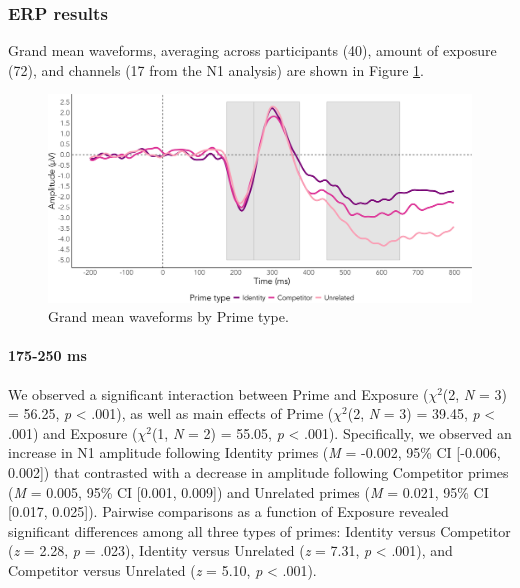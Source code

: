 \documentclass[
  12pt,
  twoside]{article}
\begin{document}
\hypertarget{erp-results}{%
\subsubsection{ERP results}\label{erp-results}}

Grand mean waveforms, averaging across participants (40), amount of exposure (72), and channels (17 from the N1 analysis) are shown in Figure \ref{fig:grand-fig}.

\begin{figure}[H]

{\centering \includegraphics[width=\textwidth]{sections/code/outputs/grand_plot} 

}

\caption{Grand mean waveforms by Prime type.}\label{fig:grand-fig}
\end{figure}

\hypertarget{ms}{%
\paragraph{175-250 ms}\label{ms}}

We observed a significant interaction between Prime and Exposure (\(\chi^2\)(2, \emph{N} = 3) = 56.25, \emph{p} \textless{} .001), as well as main effects of Prime (\(\chi^2\)(2, \emph{N} = 3) = 39.45, \emph{p} \textless{} .001) and Exposure (\(\chi^2\)(1, \emph{N} = 2) = 55.05, \emph{p} \textless{} .001).
Specifically, we observed an increase in N1 amplitude following Identity primes (\emph{M} = -0.002, 95\% CI {[}-0.006, 0.002{]}) that contrasted with a decrease in amplitude following Competitor primes (\emph{M} = 0.005, 95\% CI {[}0.001, 0.009{]}) and Unrelated primes (\emph{M} = 0.021, 95\% CI {[}0.017, 0.025{]}).
Pairwise comparisons as a function of Exposure revealed significant differences among all three types of primes: Identity versus Competitor (\emph{z} = 2.28, \emph{p} = .023), Identity versus Unrelated (\emph{z} = 7.31, \emph{p} \textless{} .001), and Competitor versus Unrelated (\emph{z} = 5.10, \emph{p} \textless{} .001).
\end{document}
